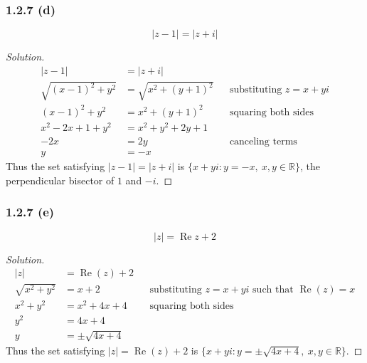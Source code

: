 \documentclass{article}
\newenvironment{solution}{
\begin{proof}[Solution]}{
\end{proof}}
\begin{document}
\subsubsection*{1.2.7 (d)}
\[
  |z-1| = |z+i|
\]
\begin{solution}
  \begin{align*}
    |z-1| &= |z+i| \\
    \sqrt{(x-1)^2 + y^2} &= \sqrt{x^2 + (y+1)^2} && \text{substituting } z = x+yi \\
    (x-1)^2 + y^2 &= x^2 + (y+1)^2 && \text{squaring both sides} \\
    x^2 - 2x + 1 + y^2 &= x^2 + y^2 + 2y + 1 \\
    -2x &= 2y && \text{canceling terms} \\
    y &= -x
  \end{align*}
  Thus the set satisfying $|z-1| = |z+i|$ is $\{x + yi : y = -x,\ x, y \in \mathbb{R}\}$, the perpendicular bisector of $1$ and $-i$.
\end{solution}

\subsubsection*{1.2.7 (e)}
\[
  |z| = \operatorname{Re} z + 2
\]
\begin{solution}
  \begin{align*}
    |z| &= \operatorname{Re}(z) + 2 \\
    \sqrt{x^2+y^2} &= x + 2 && \text{substituting } z = x+yi \text{ such that } \operatorname{Re}(z) = x \\
    x^2 + y^2 &= x^2 + 4x + 4 && \text{squaring both sides} \\
    y^2 &= 4x + 4 \\
    y &= \pm\sqrt{4x+4}
  \end{align*}
  Thus the set satisfying $|z| = \operatorname{Re}(z) + 2$ is $\{x + yi : y = \pm\sqrt{4x+4},\ x, y \in \mathbb{R}\}$.
\end{solution}
\end{document}
